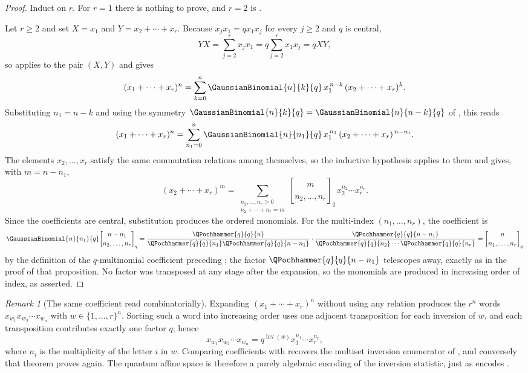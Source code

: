 \documentclass[11pt,a4paper,oneside,openany]{book}
\theoremstyle{definition}
\theoremstyle{remark}
\newtheorem{remark}[remark]{Remark}
\newcommand{\qmultinom}[2]{\genfrac{[}{]}{0pt}{}{#1}{#2}_{q}}
\newcommand{\inv}{\operatorname{inv}}
\begin{document}
\begin{proof}
Induct on $r$.  For $r=1$ there is nothing to prove, and $r=2$ is .

Let $r\ge2$ and set $X=x_1$ and $Y=x_2+\cdots+x_r$.  Because $x_jx_1=qx_1x_j$ for every $j\ge2$ and $q$ is central,
\[
 YX=\sum_{j=2}^{r}x_jx_1
 =q\sum_{j=2}^{r}x_1x_j
 =qXY,
\]
so  applies to the pair $(X,Y)$ and gives
\[
 (x_1+\cdots+x_r)^n
 =\sum_{k=0}^{n}\GaussianBinomial{n}{k}{q}\,x_1^{\,n-k}\,(x_2+\cdots+x_r)^{k}.
\]
Substituting $n_1=n-k$ and using the symmetry $\GaussianBinomial{n}{k}{q}=\GaussianBinomial{n}{n-k}{q}$ of , this reads
\[
 (x_1+\cdots+x_r)^n
 =\sum_{n_1=0}^{n}\GaussianBinomial{n}{n_1}{q}\,x_1^{\,n_1}\,(x_2+\cdots+x_r)^{\,n-n_1}.
\]
The elements $x_2,\dots,x_r$ satisfy the same commutation relations among themselves, so the inductive hypothesis applies to them and gives, with $m=n-n_1$,
\[
 (x_2+\cdots+x_r)^{m}
 =\sum_{\substack{n_2,\dots,n_r\ge0\\ n_2+\cdots+n_r=m}}
 \qmultinom{m}{n_2,\dots,n_r}\,x_2^{n_2}\cdots x_r^{n_r}.
\]
Since the coefficients are central, substitution produces the ordered
monomials.  For the multi-index $(n_1,\dots,n_r)$, the coefficient is
\[
 \GaussianBinomial{n}{n_1}{q}\qmultinom{n-n_1}{n_2,\dots,n_r}
 =\frac{\QPochhammer{q}{q}{n}}{\QPochhammer{q}{q}{n_1}\QPochhammer{q}{q}{n-n_1}}
 \cdot
 \frac{\QPochhammer{q}{q}{n-n_1}}{\QPochhammer{q}{q}{n_2}\cdots\QPochhammer{q}{q}{n_r}}
 =\qmultinom{n}{n_1,\dots,n_r}
\]
by the definition of the $q$-multinomial coefficient preceding ; the factor $\QPochhammer{q}{q}{n-n_1}$ telescopes away, exactly as in the proof of that proposition.  No factor was transposed at any stage after the expansion, so the monomials are produced in increasing order of index, as asserted.
\end{proof}

\begin{remark}[The same coefficient read combinatorially]\label{rem:quantum-multinomial-inversions}
Expanding $(x_1+\cdots+x_r)^n$ without using any relation produces the $r^n$ words $x_{w_1}x_{w_2}\cdots x_{w_n}$ with $w\in\{1,\dots,r\}^n$.  Sorting such a word into increasing order uses one adjacent transposition for each inversion of $w$, and each transposition contributes exactly one factor $q$; hence
\[
 x_{w_1}x_{w_2}\cdots x_{w_n}=q^{\inv(w)}x_1^{n_1}\cdots x_r^{n_r},
\]
where $n_i$ is the multiplicity of the letter $i$ in $w$.  Comparing coefficients with  recovers the multiset inversion enumerator of , and conversely that theorem proves  again.  The quantum affine space is therefore a purely algebraic encoding of the inversion statistic, just as  encodes .
\end{remark}
\end{document}
